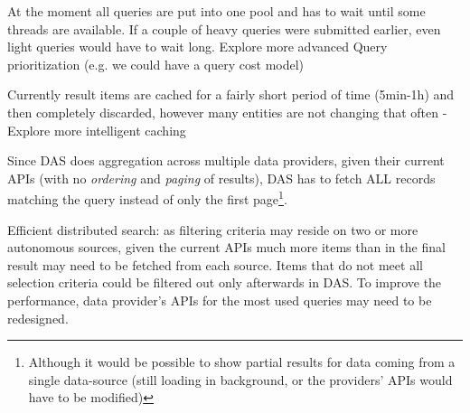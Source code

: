 \begin{compactitem}
	     				\item At the moment all queries are put into one pool and has to wait until some threads are available. If a couple of heavy queries were submitted earlier, even light queries would have to wait long. Explore more advanced Query prioritization 
	     					(e.g. we could have a query cost model)
	     					
                		\item Currently result items are cached for a fairly short period of time (5min-1h) and then completely discarded, however many entities are not changing that often - Explore more intelligent caching
	                	  
	                		

					\item Since DAS does aggregation across multiple data providers, given their current APIs (with no \textit{ordering} and \textit{paging} of results), DAS has to fetch ALL records matching the query instead of only the first page\footnote{Although it would be possible to show partial results for data coming from a single data-source (still loading in background, or the providers' APIs would have to be modified)}.		
					\item Efficient distributed search: as filtering criteria may reside on two or more autonomous sources, given the current APIs much more items than in the final result may need to be fetched from each source. Items that do not meet all selection criteria could be filtered out only afterwards in DAS. To improve the performance, data provider's APIs for the most used queries may need to be redesigned.
\end{compactitem}

